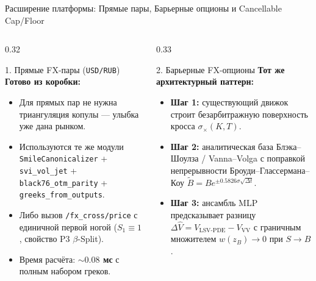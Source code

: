 \documentclass[aspectratio=169, 9pt]{beamer}
\begin{document}
\begin{frame}{Расширение платформы: Прямые пары, Барьерные опционы и Cancellable Cap/Floor}
  \begin{columns}[T]
    \begin{column}{0.32\textwidth}
      \begin{block}{1. Прямые FX-пары (\texttt{USD/RUB})}
        \scriptsize
        \textbf{Готово из коробки:}
        \begin{itemize}
          \item Для прямых пар не нужна триангуляция копулы — улыбка уже дана рынком.
          \item Используются те же модули \texttt{SmileCanonicalizer} + \texttt{svi\_vol\_jet} + \texttt{black76\_otm\_parity} + \texttt{greeks\_from\_outputs}.
          \item Либо вызов \texttt{/fx\_cross/price} с единичной первой ногой ($S_1 \equiv 1$, свойство P3 $\beta$-Split).
          \item Время расчёта: \textbf{$\sim 0.08$ мс} с полным набором греков.
        \end{itemize}
      \end{block}
    \end{column}

    \begin{column}{0.33\textwidth}
      \begin{block}{2. Барьерные FX-опционы}
        \scriptsize
        \textbf{Тот же архитектурный паттерн:}
        \begin{itemize}
          \item \textbf{Шаг 1:} существующий движок строит безарбитражную поверхность кросса $\sigma_\times(K, T)$.
          \item \textbf{Шаг 2:} аналитическая база Блэка--Шоулза / Vanna--Volga с поправкой непрерывности Броуди--Глассермана--Коу $\tilde{B} = B e^{\pm 0.5826\sigma\sqrt{\Delta t}}$.
          \item \textbf{Шаг 3:} ансамбль MLP предсказывает разницу $\Delta \hat{V} = V_{\text{LSV-PDE}} - V_{\text{VV}}$ с граничным множителем $w(z_B)\to 0$ при $S \to B$.
        \end{itemize}
      \end{block}
    \end{column}


\end{columns}
\end{frame}
\end{document}
